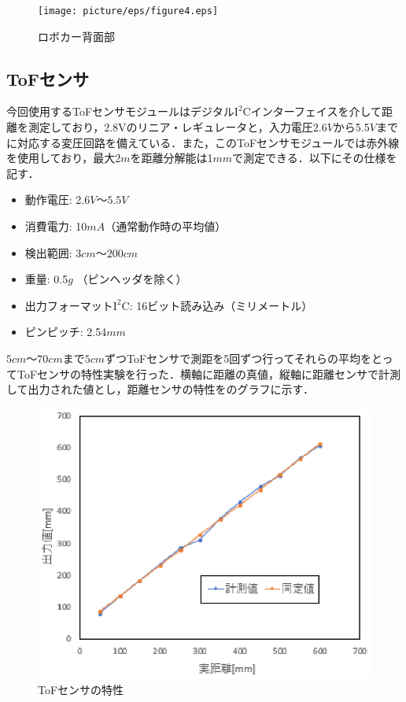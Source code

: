\begin{figure}[htb]
 \centering
  \texttt{[image: picture/eps/figure4.eps]}
  \caption{ロボカー背面部}
  \label{fig::figure4}
\end{figure}

\newpage
\subsection{ToFセンサ}
今回使用するToFセンサモジュールはデジタル$\mathrm{I^{2}C}$インターフェイスを介して距離を測定しており，2.8$\mathrm{V}$のリニア・レギュレータと，入力電圧2.6$\unit{V}$から5.5$\unit{V}$までに対応する変圧回路を備えている．また，このToFセンサモジュールでは赤外線を使用しており，最大2$\unit{m}$を距離分解能は1$\unit{mm}$で測定できる．以下にその仕様を記す\cite{tof_sensor1}．
\begin{itemize}
 \item 動作電圧: 2.6$\unit{V}〜5.5\unit{V}$
 \item 消費電力: 10$\unit{mA}$（通常動作時の平均値）
 \item 検出範囲: 3$\unit{cm}〜200\unit{cm}$
 \item 重量: 0.5$\unit{g}$ （ピンヘッダを除く）
 \item 出力フォーマット$\mathrm{I^{2}C}$: 16ビット読み込み（ミリメートル）
 \item ピンピッチ: 2.54$\unit{mm}$ 
\end{itemize}

$5\unit{cm}〜70\unit{cm}$まで$5\unit{cm}$ずつToFセンサで測距を5回ずつ行ってそれらの平均をとってToFセンサの特性実験を行った．横軸に距離の真値，縦軸に距離センサで計測して出力された値とし，距離センサの特性をのグラフに示す．

\begin{figure}[htb]
  \centering
  \includegraphics[width=0.5\hsize]{picture/eps/graph.eps}
  \caption{ToFセンサの特性}
  \label{fig::tof_graph}
 \end{figure}

